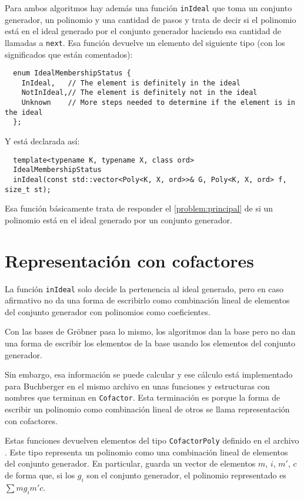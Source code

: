 \documentclass[12pt]{report}
\theoremstyle{customstyle}
\theoremstyle{factstyle}
\begin{document}
Para ambos algoritmos hay además una función \texttt{inIdeal} que toma un conjunto generador, un polinomio y una cantidad de pasos y trata de decir si el polinomio está en el ideal generado por el conjunto generador haciendo esa cantidad de llamadas a \texttt{next}. Esa función devuelve un elemento del siguiente tipo (con los significados que están comentados):

\begin{verbatim}
  enum IdealMembershipStatus {
    InIdeal,   // The element is definitely in the ideal
    NotInIdeal,// The element is definitely not in the ideal
    Unknown    // More steps needed to determine if the element is in the ideal
  };
\end{verbatim}

\noindent Y está declarada así:

\begin{verbatim}
  template<typename K, typename X, class ord>
  IdealMembershipStatus
  inIdeal(const std::vector<Poly<K, X, ord>>& G, Poly<K, X, ord> f, size_t st);
\end{verbatim}

Esa función básicamente trata de responder el \cref{problem:principal} de si un polinomio está en el ideal generado por un conjunto generador.

\section{Representación con cofactores}\label{section:representación con cofactores (librería)}

La función \texttt{inIdeal} solo decide la pertenencia al ideal generado, pero en caso afirmativo no da una forma de escribirlo como combinación lineal de elementos del conjunto generador con polinomios como coeficientes.

Con las bases de Gröbner pasa lo mismo, los algoritmos dan la base pero no dan una forma de escribir los elementos de la base usando los elementos del conjunto generador.

Sin embargo, esa información se puede calcular y ese cálculo está implementado para Buchberger en el mismo archivo  en unas funciones y estructuras con nombres que terminan en \texttt{Cofactor}. Esta terminación es porque la forma de escribir un polinomio como combinación lineal de otros se llama representación con cofactores.

Estas funciones devuelven elementos del tipo \texttt{CofactorPoly} definido en el archivo . Este tipo representa un polinomio como una combinación lineal de elementos del conjunto generador. En particular, guarda un vector de elementos $m$, $i$, $m'$, $c$ de forma que, si los $g_i$ son el conjunto generador, el polinomio representado es $∑ m g_i m' c$.
\end{document}
